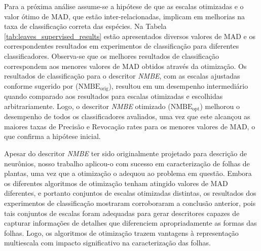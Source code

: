 {Para a próxima análise assume-se a hipótese de que as escalas otimizadas e o valor ótimo de MAD, que estão inter-relacionadas, implicam em melhorias na taxa de classificação correta das espécies. Na Tabela \ref{tab:leaves_supervised_results} estão apresentados diversos valores de MAD e os correspondentes resultados em experimentos de classificação para diferentes classificadores. Observa-se que os melhores resultados de classificação correspondem aos menores valores de MAD obtidos através da otimização. Os resultados de classificação para o descritor \emph{NMBE}, com as escalas ajustadas conforme sugerido por  ($\operatorname{NMBE_{orig}}$), resultou em um desempenho intermediário quando comparado aos resultados para escalas otimizadas e escolhidas arbitrariamente. Logo, o descritor \emph{NMBE} otimizado ($\operatorname{NMBE_{opt}}$) melhorou o desempenho de todos os classificadores avaliados, uma vez que este alcançou as maiores taxas de Precisão e Revocação rates para os menores valores de MAD, o que confirma a hipótese inicial.

Apesar do descritor \emph{NMBE} ter sido originalmente projetado para descrição de neurônios, nosso trabalho aplicou-o com sucesso em caracterização de folhas de plantas, uma vez que a otimização o adequou ao problema em questão.
Embora os diferentes algoritmos de otimização tenham atingido valores de MAD diferentes, e portanto conjuntos de escalas otimizadas distintas, os resultados dos experimentos de classificação mostraram corroboraram a conclusão anterior, pois tais conjuntos de escalas foram adequadas para gerar descritores capazes de capturar informações de detalhes que diferenciem apropriadamente as formas das folhas. Logo, os algoritmos de otimização trazem vantagens à representação multiescala com impacto significativo na caracterização das folhas. 

}
